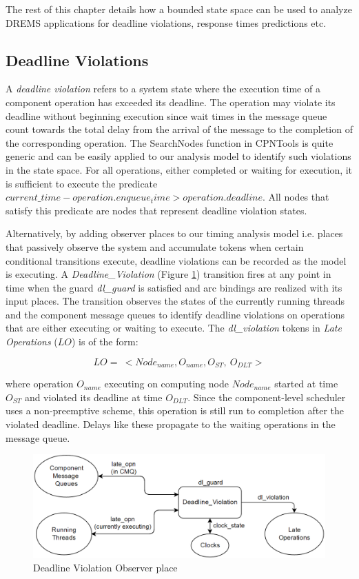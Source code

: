 The rest of this chapter details how a bounded state space can be used to analyze DREMS applications for deadline violations, response times predictions etc. 

\subsection{Deadline Violations}

A \emph{deadline violation} refers to a system state where the execution time of a component operation has exceeded its deadline. The operation may violate its deadline without beginning execution since wait times in the message queue count towards the total delay from the arrival of the message to the completion of the corresponding operation. The SearchNodes function in CPNTools is quite generic and can be easily applied to our analysis model to identify such violations in the state space. For all operations, either completed or waiting for execution, it is sufficient to execute the predicate $current\_time - operation.enqueue_time > operation.deadline$. All nodes that satisfy this predicate are nodes that represent deadline violation states. 

Alternatively, by adding observer places to our timing analysis model i.e. places that passively observe the system and accumulate tokens when certain conditional transitions execute, deadline violations can be recorded as the model is executing. A \emph{Deadline\_Violation} (Figure \ref{fig:DL}) transition fires at any point in time when the guard \emph{dl\_guard} is satisfied and arc bindings are realized with its input places. The transition observes the states of the currently running threads and the component message queues to identify deadline violations on operations that are either executing or waiting to execute. The \emph{dl\_violation} tokens in \emph{Late Operations} ($LO$) is of the form:

\begin{equation}
\label{eq:DLV}
LO = \ <Node_{name}, O_{name}, O_{ST}, \ O_{DLT}>
\end{equation}

where operation $O_{name}$ executing on computing node $Node_{name}$ started at time $O_{ST}$ and violated its deadline at time $O_{DLT}$. Since the component-level scheduler uses a non-preemptive scheme, this operation is still run to completion after the violated deadline. Delays like these propagate to the waiting operations in the message queue.

\begin{figure}[htb]
	\centering
	\includegraphics[width=\textwidth]{./img/Deadline_Violations.png}
	\caption{Deadline Violation Observer place}
	\label{fig:DL}
\end{figure}
\FloatBarrier


